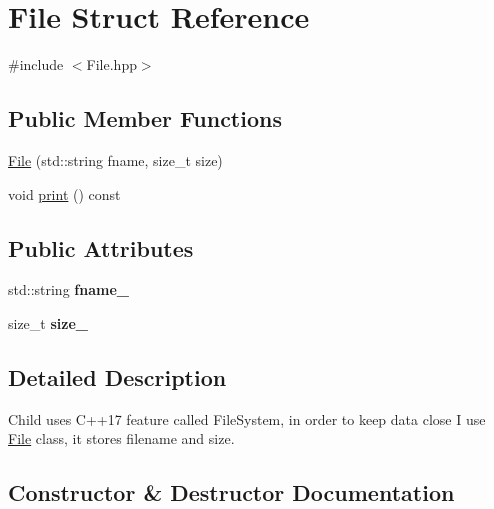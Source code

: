 \hypertarget{structFile}{}\section{File Struct Reference}
\label{structFile}


{\ttfamily \#include $<$File.\+hpp$>$}

\subsection*{Public Member Functions}
\begin{DoxyCompactItemize}
\item 
\hyperlink{structFile_ad0746cf10905ee35809f9e64452dc947}{File} (std\+::string fname, size\+\_\+t size)
\item 
void \hyperlink{structFile_a953519811424483b08848c889a7f0743}{print} () const 
\end{DoxyCompactItemize}
\subsection*{Public Attributes}
\begin{DoxyCompactItemize}
\item 
std\+::string {\bfseries fname\+\_\+}\hypertarget{structFile_ac40ef1df4d43c2dee0086ea073e5b1fd}{}\label{structFile_ac40ef1df4d43c2dee0086ea073e5b1fd}

\item 
size\+\_\+t {\bfseries size\+\_\+}\hypertarget{structFile_ac884c55c119bb40a06be3f81abaa79ab}{}\label{structFile_ac884c55c119bb40a06be3f81abaa79ab}

\end{DoxyCompactItemize}


\subsection{Detailed Description}
Child uses C++17 feature called File\+System, in order to keep data close I use \hyperlink{structFile}{File} class, it stores filename and size. 

\subsection{Constructor \& Destructor Documentation}
